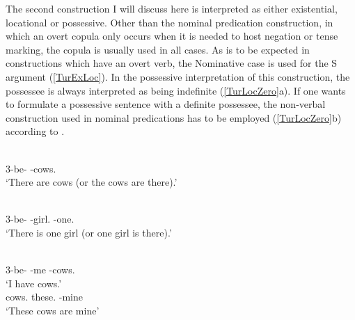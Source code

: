 The second construction I will discuss here is interpreted as either existential, locational or possessive.
Other than the nominal predication construction, in which an overt copula only occurs when it is needed to host negation or tense marking, the copula is usually used in all cases. 
As is to be expected in constructions which have an overt verb, the Nominative case is used for the S argument (\ref{TurExLoc}).
In the possessive interpretation of this construction, the possessee is always interpreted as being indefinite (\ref{TurLocZero}a). 
If one wants to formulate a possessive sentence with a definite possessee, the non-verbal construction used in nominal predications has to be employed (\ref{TurLocZero}b)  according to \citet[82]{Dimmendaal:1982}.
%


\begin{exe}\ex\label{TurExLoc}
\begin{xlist}
\ex\gll{} \\
3-be-\pl{} \NC{}-cows.\nom{}\\
\glt `There are cows (or the cows are there).'

\ex\gll{}  \\
3-be-\asp{} \NC{}-girl.\nom{} \NC{}-one.\nom{}\\
\glt `There is one girl (or one girl is there).'
\end{xlist}
\end{exe} %

\pagebreak
\begin{exe}
 \ex\label{TurLocZero}
\begin{xlist}
\ex\gll{}  \\
3-be-\pl{} \NC{}-me \NC{}-cows.\nom{}\\
\glt `I have cows.'
\ex\gll{}  \\
cows.\acc{} these.\acc{} \NC{}-mine\\
\glt `These cows are mine'
\end{xlist}
\end{exe}

